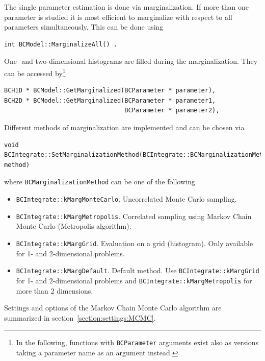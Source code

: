 \documentclass[11pt, a4paper]{article}
\newcommand{\code}[1]{\texttt{#1}}
\begin{document}
The single parameter estimation is done via marginalization. If more
than one parameter is studied it is most efficient to marginalize with
respect to all parameters simultaneously. This can be done using
%
\begin{verbatim}
int BCModel::MarginalizeAll() .
\end{verbatim}
%
One- and two-dimensional histograms are filled during the
marginalization. They can be accessed by\footnote{In the following,
  functions with \code{BCParameter} arguments exist also as versions
  taking a parameter name as an argument instead.}
%
\begin{verbatim}
BCH1D * BCModel::GetMarginalized(BCParameter * parameter),
BCH2D * BCModel::GetMarginalized(BCParameter * parameter1,
                                 BCParameter * parameter2),
\end{verbatim}

%

Different methods of marginalization are implemented and can be chosen
via
%
\begin{verbatim}
void BCIntegrate::SetMarginalizationMethod(BCIntegrate::BCMarginalizationMethod method)
\end{verbatim}

where \verb|BCMarginalizationMethod| can be one of the following
%
\begin{itemize}
\item \verb|BCIntegrate::kMargMonteCarlo|. Uncorrelated Monte Carlo sampling.
\item \verb|BCIntegrate::kMargMetropolis|. Correlated sampling using
  Markov Chain Monte Carlo (Metropolis algorithm).
\item \verb|BCIntegrate::kMargGrid|. Evaluation on a grid
  (histogram). Only available for 1- and 2-dimensional problems.
\item \verb|BCIntegrate::kMargDefault|. Default method. Use
  \verb|BCIntegrate::kMargGrid| for 1- and 2-dimensional problems and
  \verb|BCIntegrate::kMargMetropolis| for more than 2 dimensions.
\end{itemize}

Settings and options of the Markov Chain Monte Carlo algorithm are
summarized in section~\ref{section:settings:MCMC}.
\end{document}

